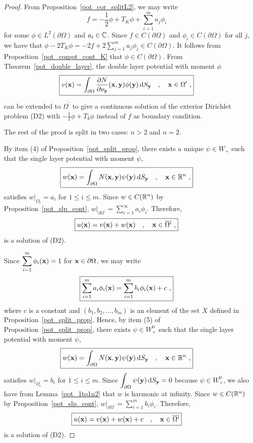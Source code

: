 \begin{proof}
  From Proposition~\ref{pot_cor_splitL2}, we may write
\[
\boxed{
f = - \frac{1}{2} \phi + T_K \phi + \sum_{i=1}^m a_j \phi_i
}
\]
for some $\displaystyle \phi \in L^2(\partial \Omega)$ and $a_i \in \mathbb{C}$.
Since $f\in C(\partial \Omega)$ and $\phi_i \in C(\partial \Omega)$
for all $j$, we have that
$\displaystyle
\phi -2 T_K \phi = -2f + 2 \sum_{j=1}^m a_j \phi_j \in C(\partial \Omega)$.
It follows from Proposition~\ref{pot_compt_cont_K} that
$\phi \in C(\partial \Omega)$.  From Theorem~\ref{pot_double_layer},
the double layer potential with moment $\phi$
\[
\boxed{
v(\mathbf{x}) = \int_{\partial \Omega}
\frac{\partial{N}}{\partial \mathbf{\nu}_{\mathbf{y}}}(\mathbf{x},\mathbf{y}) \phi(\mathbf{y})
\,\mathrm{d}{S}_{\mathbf{y}} \quad , \quad \mathbf{x} \in \Omega^{\prime} \ ,
}
\]
can be extended to $\overline{\Omega^{\prime}}$ to give a continuous
solution of the exterior Dirichlet problem (D2) with
$\displaystyle -\frac{1}{2} \phi + T_k \phi$ instead of $f$ as boundary
condition.

The rest of the proof is split in two cases: $n>2$ and $n=2$.

By item (4) of Proposition~\ref{pot_split_prop}, there
exists a unique $\psi \in W_+$ such that the single layer potential
with moment $\psi$,
\[
\boxed{
w(\mathbf{x}) = \int_{\partial \Omega} N(\mathbf{x},\mathbf{y})
\psi(\mathbf{y}) \,\mathrm{d}{S}_{\mathbf{y}} \quad , \quad \mathbf{x} \in \mathbb{R}^n \ ,
}
\]
satisfies $\displaystyle w\big|_{\Omega_i} = a_i$ for
$1\leq i \leq m$.
Since $\displaystyle w \in C(\mathbb{R}^n)$ by Proposition~\ref{pot_slp_cont},
$\displaystyle 
w\big|_{\partial \Omega^{\prime}} = \sum_{i=1}^\infty a_i \phi_i$.
Therefore,
\[
\boxed{
u(\mathbf{x}) = v(\mathbf{x}) + w(\mathbf{x}) \quad , \quad \mathbf{x} \in
\overline{\Omega^{\prime}} \ ,
}
\]
is a solution of (D2).

Since
$\displaystyle \sum_{i=1}^m \phi_i(\mathbf{x}) = 1$ for
$\mathbf{x} \in \partial \Omega$, we may write
\[
\boxed{
\sum_{i=1}^m a_i \phi_i(\mathbf{x}) = \sum_{i=1}^m b_i \phi_i(\mathbf{x}) + c \ ,
}
\]
where $c$ is a constant and $(b_1,b_2, \ldots, b_m)$ is an element of
the set $X$ defined in Proposition~\ref{pot_split_prop}.  Hence, by
item (5) of Proposition~\ref{pot_split_prop}, there
exists $\displaystyle \psi \in W_+^0$ such that the single layer
potential with moment $\psi$,
\[
\boxed{
w(\mathbf{x}) = \int_{\partial \Omega} N(\mathbf{x},\mathbf{y})
\psi(\mathbf{y}) \,\mathrm{d}{S}_{\mathbf{y}} \quad , \quad \mathbf{x} \in \mathbb{R}^n \  ,
}
\]
satisfies $\displaystyle w\big|_{\Omega_i} = b_i$ for
$1\leq i \leq m$.  Since
$\displaystyle \int_{\partial \Omega} \psi(\mathbf{y}) \,\mathrm{d}{S}_{\mathbf{y}} = 0$
because $\psi\in W_+^0$, we also have from Lemma~\ref{pot_1to1n2} that
$w$ is harmonic at infinity.  Since $w \in C(\mathbb{R}^n)$ by
Proposition~\ref{pot_slp_cont},
$\displaystyle 
w\big|_{\partial \Omega^{\prime}} = \sum_{i=1}^m b_i \phi_i$.
Therefore,
\[
\boxed{
u(\mathbf{x}) = v(\mathbf{x}) + w(\mathbf{x}) + c \quad , \quad \mathbf{x} \in
\overline{\Omega^{\prime}}
}
\]
is a solution of (D2).
\end{proof}

